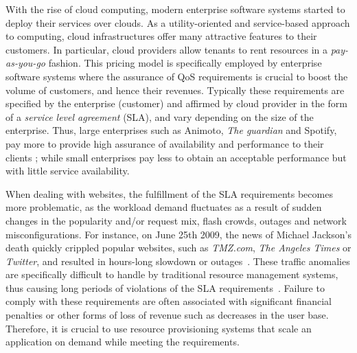 With the rise of cloud computing, modern enterprise software systems started to deploy their services over clouds. As a utility-oriented and service-based approach to computing, cloud infrastructures offer many attractive features to their customers.  In particular, cloud providers allow tenants to rent resources in a \emph{pay-as-you-go} fashion. This pricing model is specifically employed by enterprise software systems where the assurance of QoS requirements is crucial to boost the volume of customers, and hence their revenues. Typically these requirements are specified by the enterprise (customer) and affirmed by cloud provider in the form of a \emph{service level agreement} (SLA), and vary depending on the size of the enterprise. Thus, large enterprises such as Animoto, \emph{The guardian} and Spotify, pay more to provide high assurance of availability and performance to their clients \cite{casestudiescloud}; while small enterprises pay less to obtain an acceptable performance but with little service availability. 



When dealing with websites, the fulfillment of the SLA requirements becomes more problematic, as the workload demand fluctuates as a result of sudden changes in the popularity and/or request mix, flash crowds, outages and network misconfigurations.
For instance, on June 25th 2009, the news of Michael Jackson's death quickly crippled popular websites, such as \emph{TMZ.com}, \emph{The Angeles Times} or \emph{Twitter}, and resulted in hours-long slowdown or outages~\cite{outagesTimes}. These traffic anomalies are specifically difficult to handle by traditional resource management systems, thus causing long periods of violations of the SLA requirements~\cite{trafficCongestion}. Failure to comply with these requirements are often associated with significant financial penalties or other forms of loss of revenue such as decreases in the user base. 
Therefore, it is crucial to use resource provisioning systems that scale an application on demand while meeting the requirements.

